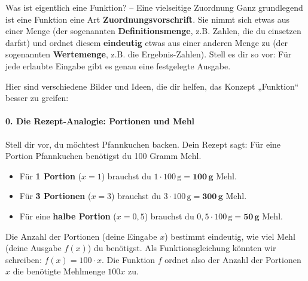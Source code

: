 \begin{infoboxumgebung}{Was ist eigentlich eine Funktion? – Eine vielseitige Zuordnung}
Ganz grundlegend ist eine Funktion eine Art \textbf{Zuordnungsvorschrift}. Sie nimmt sich etwas aus einer Menge (der sogenannten \textbf{Definitionsmenge}, z.B. Zahlen, die du einsetzen darfst) und ordnet diesem \textbf{eindeutig} etwas aus einer anderen Menge zu (der sogenannten \textbf{Wertemenge}, z.B. die Ergebnis-Zahlen). Stell es dir so vor: Für jede erlaubte Eingabe gibt es genau eine festgelegte Ausgabe.

Hier sind verschiedene Bilder und Ideen, die dir helfen, das Konzept „Funktion“ besser zu greifen:

\paragraph{0. Die Rezept-Analogie: Portionen und Mehl}
Stell dir vor, du möchtest Pfannkuchen backen. Dein Rezept sagt: Für eine Portion Pfannkuchen benötigst du 100 Gramm Mehl.
\begin{itemize}
    \item Für \textbf{1 Portion} ($x=1$) brauchst du $1 \cdot 100\,\text{g} = \mathbf{100\,\textbf{g}}$ Mehl.
    \item Für \textbf{3 Portionen} ($x=3$) brauchst du $3 \cdot 100\,\text{g} = \mathbf{300\,\textbf{g}}$ Mehl.
    \item Für eine \textbf{halbe Portion} ($x=0,5$) brauchst du $0,5 \cdot 100\,\text{g} = \mathbf{50\,\textbf{g}}$ Mehl.
\end{itemize}
Die Anzahl der Portionen (deine Eingabe $x$) bestimmt eindeutig, wie viel Mehl (deine Ausgabe $f(x)$) du benötigst. Als Funktionsgleichung könnten wir schreiben: $f(x) = 100 \cdot x$. Die Funktion $f$ ordnet also der Anzahl der Portionen $x$ die benötigte Mehlmenge $100x$ zu.


\end{infoboxumgebung}
